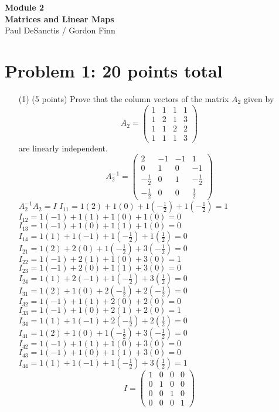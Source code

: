 \documentclass[12pt]{article}
\begin{document}
\begin{center}

{\Large\bf Module 2\\
\vspace{0.5cm}
Matrices and Linear Maps}\\[10pt]
Paul DeSanctis / Gordon Finn
\end{center}

\section*{Problem 1: 20 points total}
\label{prob-3.2}
\begin{itemize}
\item[(1)](5 points)
Prove that the column vectors of the matrix $A_2$ given by 
\[
A_2 = 
\begin{pmatrix}
1 & 1 & 1 & 1\\
1 & 2 & 1 & 3 \\
1 & 1 & 2 & 2 \\
1 & 1 & 1 & 3
\end{pmatrix}
\]
are linearly  independent.
\[
A_2^{-1} = 
\begin{pmatrix}
2 & -1 & -1 & 1\\
0 & 1 & 0 & -1 \\
-\frac{1}{2} & 0 & 1 & -\frac{1}{2} \\
-\frac{1}{2} & 0 & 0 & \frac{1}{2}
\end{pmatrix}
\]
$A_2^{-1}A_2=I$
\newline $I_{11}=1(2)+1(0)+1(-\frac{1}{2})+1(-\frac{1}{2})=1$
\newline $I_{12}=1(-1)+1(1)+1(0)+1(0)=0$
\newline $I_{13}=1(-1)+1(0)+1(1)+1(0)=0$
\newline $I_{14}=1(1)+1(-1)+1(-\frac{1}{2})+1(\frac{1}{2})=0$
\newline $I_{21}=1(2)+2(0)+1(-\frac{1}{2})+3(-\frac{1}{2})=0$
\newline $I_{22}=1(-1)+2(1)+1(0)+3(0)=1$
\newline $I_{23}=1(-1)+2(0)+1(1)+3(0)=0$
\newline $I_{24}=1(1)+2(-1)+1(-\frac{1}{2})+3(\frac{1}{2})=0$
\newline $I_{31}=1(2)+1(0)+2(-\frac{1}{2})+2(-\frac{1}{2})=0$
\newline $I_{32}=1(-1)+1(1)+2(0)+2(0)=0$
\newline $I_{33}=1(-1)+1(0)+2(1)+2(0)=1$
\newline $I_{34}=1(1)+1(-1)+2(-\frac{1}{2})+2(\frac{1}{2})=0$
\newline $I_{41}=1(2)+1(0)+1(-\frac{1}{2})+3(-\frac{1}{2})=0$
\newline $I_{42}=1(-1)+1(1)+1(0)+3(0)=0$
\newline $I_{43}=1(-1)+1(0)+1(1)+3(0)=0$
\newline $I_{44}=1(1)+1(-1)+1(-\frac{1}{2})+3(\frac{1}{2})=1$
\[
I = 
\begin{pmatrix}
1 & 0 & 0 & 0\\
0 & 1 & 0 & 0 \\
0 & 0 & 1 & 0 \\
0 & 0 & 0 & 1
\end{pmatrix}
\]




\end{itemize}
\end{document}
